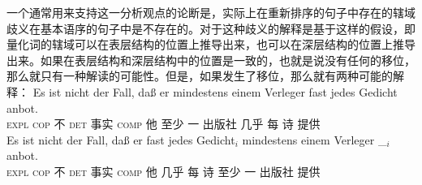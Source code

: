 %
一个通常用来支持这一分析观点的论断是，实际上在重新排序的句子中存在的辖域歧义在基本语序的句子中是不存在的。对于这种歧义的解释是基于这样的假设，即量化词的辖域可以在表层结构的位置上推导出来，也可以在深层结构的位置上推导出来。如果在表层结构和深层结构中的位置是一致的，也就是说没有任何的移位，那么就只有一种解读的可能性。但是，如果发生了移位，那么就有两种可能的解释\citep[\page ]{Frey93a}：
\eal
\ex 
\gll Es ist nicht der Fall, daß er mindestens einem Verleger fast jedes Gedicht anbot.\\
     \textsc{expl} \textsc{cop} 不 \textsc{det} 事实 \textsc{comp} 他 至少 一 出版社 几乎 每 诗 提供\\
\ex 
\gll Es ist nicht der Fall, daß er fast jedes Gedicht$_i$ mindestens einem Verleger \_$_i$ anbot.\\
      \textsc{expl} \textsc{cop} 不 \textsc{det} 事实 \textsc{comp} 他 几乎 每 诗 至少 一 出版社 {} 提供\\
\zl

